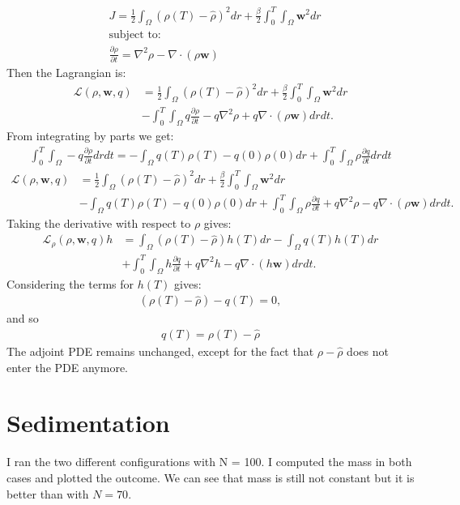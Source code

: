 \documentclass[11pt, a4paper]{article}
\theoremstyle{definition}
\newcommand{\w}{\mathbf{w}}
\begin{document}
		\begin{align*}
		&J = \frac{1}{2} \int_\Omega (\rho(T) - \widehat \rho)^2 dr  + \frac{\beta}{2} \int_0^T\int_\Omega \w^2 dr\\
		&\text{subject to:}\\
		&\frac{\partial \rho}{\partial t} = \nabla^2 \rho - \nabla \cdot (\rho \w)
	\end{align*}
	Then the Lagrangian is:
	\begin{align*}
		\mathcal{L}(\rho,\w, q) &= \frac{1}{2} \int_\Omega (\rho(T) - \widehat \rho)^2 dr  + \frac{\beta}{2} \int_0^T\int_\Omega \w^2 dr\\
		&- \int_0^T \int_\Omega q\frac{\partial \rho}{\partial t} - q\nabla^2 \rho + q\nabla \cdot (\rho \w) dr dt.
	\end{align*}
	From integrating by parts we get:
	\begin{align*}
	\int_0^T \int_\Omega	-q\frac{\partial \rho}{\partial t} dr dt= - \int_\Omega q(T) \rho(T) - q(0) \rho(0) dr +  \int_0^T \int_\Omega	\rho \frac{\partial q}{\partial t} dr dt
	\end{align*}
		\begin{align*}
		\mathcal{L}(\rho,\w, q) &= \frac{1}{2} \int_\Omega (\rho(T) - \widehat \rho)^2 dr  + \frac{\beta}{2} \int_0^T\int_\Omega \w^2 dr\\
		&- \int_\Omega q(T) \rho(T) - q(0) \rho(0) dr + \int_0^T \int_\Omega \rho \frac{\partial q}{\partial t}   + q\nabla^2 \rho - q\nabla \cdot (\rho \w) dr dt.
	\end{align*}
	Taking the derivative with respect to $\rho $ gives:
	\begin{align*}
		\mathcal{L}_\rho(\rho,\w, q)h &= \int_\Omega  (\rho(T) - \widehat \rho) h(T) dr - \int_\Omega q(T) h(T) dr\\
		&+ \int_0^T \int_\Omega h \frac{\partial q}{\partial t}   + q\nabla^2 h - q\nabla \cdot (h \w) dr dt.
	\end{align*}
	Considering the terms for $h(T)$ gives:
	\begin{align*}
		(\rho(T) - \widehat \rho) - q(T) = 0,
	\end{align*}
	and so 
	\begin{align*}
	q(T) = \rho(T) - \widehat \rho
	\end{align*}
	The adjoint PDE remains unchanged, except for the fact that $ \rho - \widehat \rho$ does not enter the PDE anymore.

	\section{Sedimentation}
	I ran the two different configurations with N = 100. I computed the mass in both cases and plotted the outcome. We can see that mass is still not constant but it is better than with $ N = 70$. 
	
\end{document}
